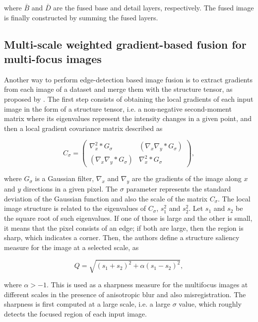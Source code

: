 \noindent where $\bar{B}$ and $\bar{D}$ are the fused base and detail layers, respectively. The fused image is finally constructed by summing the fused layers.

\subsection{Multi-scale weighted gradient-based fusion for multi-focus images}

Another way to perform edge-detection based image fusion is to extract gradients from each image of a dataset and merge them with the structure tensor, as proposed by . The first step consists of obtaining the local gradients of each input image in the form of a structure tensor, i.e. a non-negative second-moment matrix where its eigenvalues represent the intensity changes in a given point, and then a local gradient covariance matrix described as

\begin{equation}
C_{\sigma} =
    \begin{pmatrix}
        \nabla_{x}^{2} \ast G_{\sigma}
        &
        \left(
            \nabla_{x}\nabla_{y} \ast G_{\sigma}
        \right)
        \\
        \left(
            \nabla_{x}\nabla_{y} \ast G_{\sigma}
        \right)
        &
        \nabla_{x}^{2} \ast G_{\sigma}
    \end{pmatrix},
\end{equation}

\noindent where $G_{\sigma}$ is a Gaussian filter, $\nabla_{x}$ and $\nabla_{y}$ are the gradients of the image along $x$ and $y$ directions in a given pixel. The $\sigma$ parameter represents the standard deviation of the Gaussian function and also the scale of the matrix $C_{\sigma}$. The local image structure is related to the eigenvalues of $C_{\sigma}$, $s_{1}^{2}$ and $s_{2}^{2}$. Let $s_{1}$ and $s_{2}$ be the square root of such eigenvalues. If one of those is large and the other is small, it means that the pixel consists of an edge; if both are large, then the region is sharp, which indicates a corner. Then, the authors define a structure saliency measure for the image at a selected scale, as

\begin{equation}
\label{eqn:structure_saliency}
Q = \sqrt{(s_{1} + s_{2})^{2} + \alpha(s_{1} - s_{2})^{2}},
\end{equation}

\noindent where $\alpha > -1$. This is used as a sharpness measure for the multifocus images at different scales in the presence of anisotropic blur and also misregistration. The sharpness is first computed at a large scale, i.e. a large $\sigma$ value, which roughly detects the focused region of each input image.

